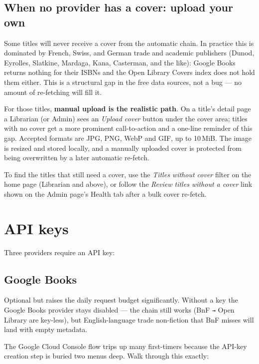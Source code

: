 \subsection*{When no provider has a cover: upload your own}

Some titles will never receive a cover from the automatic chain. In
practice this is dominated by French, Swiss, and German trade and
academic publishers (Dunod, Eyrolles, Slatkine, Mardaga, Kana,
Casterman, and the like): Google Books returns nothing for their
ISBNs and the Open Library Covers index does not hold them either.
This is a structural gap in the free data sources, not a bug --- no
amount of re-fetching will fill it.

For those titles, \textbf{manual upload is the realistic path}. On a
title's detail page a Librarian (or Admin) sees an \emph{Upload
cover} button under the cover area; titles with no cover get a more
prominent call-to-action and a one-line reminder of this gap.
Accepted formats are JPG, PNG, WebP and GIF, up to 10\,MiB. The
image is resized and stored locally, and a manually uploaded cover
is protected from being overwritten by a later automatic re-fetch.

To find the titles that still need a cover, use the \emph{Titles
without cover} filter on the home page (Librarian and above), or
follow the \emph{Review titles without a cover} link shown on the
Admin page's Health tab after a bulk cover re-fetch.

\section{API keys}

Three providers require an API key:

\subsection*{Google Books}

Optional but raises the daily request budget significantly. Without
a key the Google Books provider stays disabled — the chain still
works (BnF \texttt{→} Open Library are key-less), but English-language
trade non-fiction that BnF misses will land with empty metadata.

The Google Cloud Console flow trips up many first-timers because
the API-key creation step is buried two menus deep. Walk through
this exactly:

